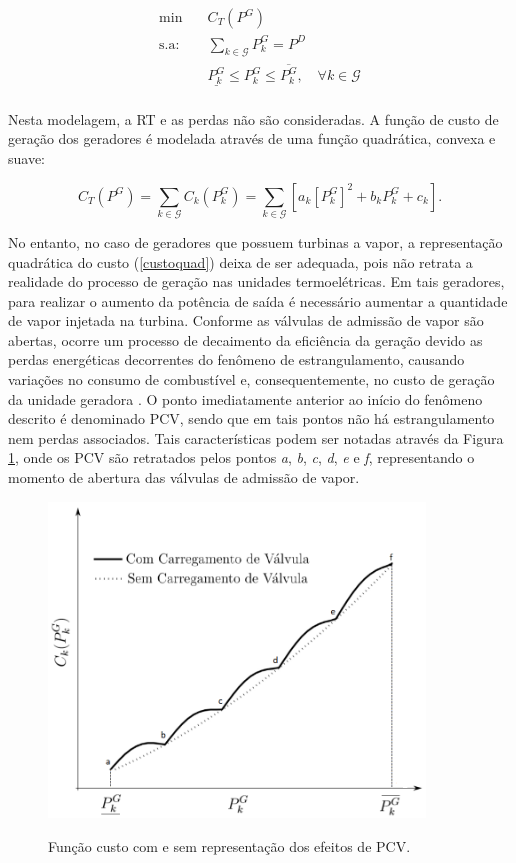 \documentclass[
	12pt,				%
	openany,			%
	twoside,			%
	a4paper,			%
	chapter=TITLE,		%
	section=Title,		%
	subsection=Title,	%
	subsubsection=Title,%
	english,			%
	french,				%
	spanish,			%
	brazil			%
	]{abntex2}
\begin{document}
\begin{ERRATA}
\begin{equation}\label{de_classic}
\begin{aligned}
\text{min}  &\quad C_T(P^{G}) \\
\text{s.a:} &\quad \sum_{k \in \mathcal{G}}P^G_k = P^D \\
&\quad \underline{P^{G}_{k}} \leq P^{G}_{k} \leq \overline{P^{G}_{k}},\quad \forall k \in \mathcal{G}\\
\end{aligned}
\end{equation}

Nesta modelagem, a RT e as perdas não são consideradas. A função de custo de geração dos geradores é modelada através de uma função quadrática, convexa e suave:


\begin{equation} \label{custoquad}
C_T(P^{G}) = \sum_{k \in \mathcal{G}} C_k(P^{G}_k) = \sum_{k \in \mathcal{G}} [a_k[P^{G}_k]^2 + b_kP^{G}_k + c_k].
\end{equation}

No entanto, no caso de geradores que possuem turbinas a vapor, a representação quadrática do custo (\ref{custoquad}) deixa de ser adequada, pois não retrata a realidade do processo de geração nas unidades termoelétricas. Em tais geradores, para realizar o aumento da potência de saída é necessário aumentar a quantidade de vapor injetada na turbina. Conforme as válvulas de admissão de vapor são abertas, ocorre um processo de decaimento da eficiência da geração devido as perdas energéticas decorrentes do fenômeno de estrangulamento, causando variações no consumo de combustível e, consequentemente, no custo de geração da unidade geradora \cite{NIKNAM}. O ponto imediatamente anterior ao início do fenômeno descrito é denominado PCV, sendo que em tais pontos não há estrangulamento nem perdas associados. Tais características podem ser notadas através da Figura \ref{FIGPCV}, onde os PCV são retratados pelos pontos \emph{a}, \emph{b}, \emph{c}, \emph{d}, \emph{e} e \emph{f}, representando o momento de abertura das válvulas de admissão de vapor.

\begin{figure}[!h]
\centering
\caption{Função custo com e sem representação dos efeitos de PCV.}
\includegraphics[width=100mm]{images/PCV2.png}
\label{FIGPCV}
\end{figure}



\end{ERRATA}
\end{document}
